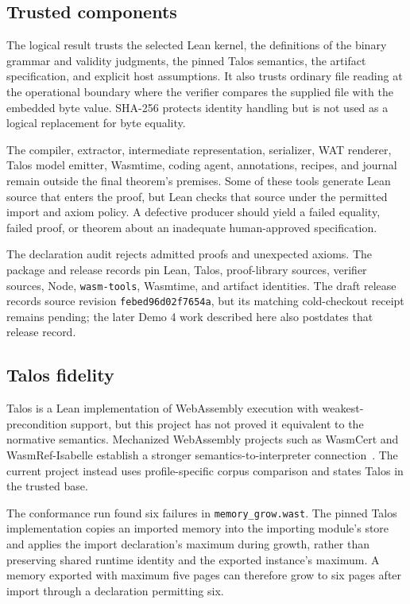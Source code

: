 \documentclass[11pt]{article}
\newcommand{\code}[1]{\texttt{#1}}
\begin{document}
\subsection{Trusted components}

The logical result trusts the selected Lean kernel, the definitions of the binary grammar and validity judgments, the pinned Talos semantics, the artifact specification, and explicit host assumptions.  It also trusts ordinary file reading at the operational boundary where the verifier compares the supplied file with the embedded byte value.  SHA-256 protects identity handling but is not used as a logical replacement for byte equality.

The compiler, extractor, intermediate representation, serializer, WAT renderer, Talos model emitter, Wasmtime, coding agent, annotations, recipes, and journal remain outside the final theorem's premises.  Some of these tools generate Lean source that enters the proof, but Lean checks that source under the permitted import and axiom policy.  A defective producer should yield a failed equality, failed proof, or theorem about an inadequate human-approved specification.

The declaration audit rejects admitted proofs and unexpected axioms.  The package and release records pin Lean, Talos, proof-library sources, verifier sources, Node, \code{wasm-tools}, Wasmtime, and artifact identities.  The draft release records source revision \code{febed96d02f7654a}, but its matching cold-checkout receipt remains pending; the later Demo 4 work described here also postdates that release record.

\subsection{Talos fidelity}

Talos is a Lean implementation of WebAssembly execution with weakest-precondition support, but this project has not proved it equivalent to the normative semantics.  Mechanized WebAssembly projects such as WasmCert and WasmRef-Isabelle establish a stronger semantics-to-interpreter connection~\cite{Watt2018Mechanising,Watt2021Two,Watt2023WasmRef}.  The current project instead uses profile-specific corpus comparison and states Talos in the trusted base.

The conformance run found six failures in \code{memory\_grow.wast}.  The pinned Talos implementation copies an imported memory into the importing module's store and applies the import declaration's maximum during growth, rather than preserving shared runtime identity and the exported instance's maximum.  A memory exported with maximum five pages can therefore grow to six pages after import through a declaration permitting six.
\end{document}
